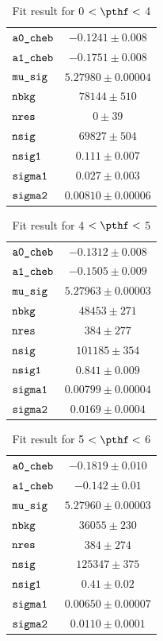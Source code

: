 \begin{table}[H]
    \centering
    \caption{Fit result for 0 $ < \pthf < $ 4}
    \label{tab:fit_results_pthf1}
\begin{tabular}{lc}
$\verb+a0_cheb+ $ & $ -0.1241\pm 0.008$\\
$\verb+a1_cheb+ $ & $ -0.1751\pm 0.008$\\
$\verb+mu_sig+ $ & $  5.27980\pm 0.00004$\\
$\verb+nbkg+ $ & $  78144\pm 510$\\
$\verb+nres+ $ & $  0\pm 39$\\
$\verb+nsig+ $ & $  69827\pm 504$\\
$\verb+nsig1+ $ & $  0.111\pm 0.007$\\
$\verb+sigma1+ $ & $  0.027\pm 0.003$\\
$\verb+sigma2+ $ & $  0.00810\pm 0.00006$\\
\end{tabular}
\end{table}
\begin{table}[H]
    \centering
    \caption{Fit result for 4 $ < \pthf < $ 5}
    \label{tab:fit_results_pthf2}
\begin{tabular}{lc}
$\verb+a0_cheb+ $ & $ -0.1312\pm 0.008$\\
$\verb+a1_cheb+ $ & $ -0.1505\pm 0.009$\\
$\verb+mu_sig+ $ & $  5.27963\pm 0.00003$\\
$\verb+nbkg+ $ & $  48453\pm 271$\\
$\verb+nres+ $ & $  384\pm 277$\\
$\verb+nsig+ $ & $  101185\pm 354$\\
$\verb+nsig1+ $ & $  0.841\pm 0.009$\\
$\verb+sigma1+ $ & $  0.00799\pm 0.00004$\\
$\verb+sigma2+ $ & $  0.0169\pm 0.0004$\\
\end{tabular}
\end{table}
\begin{table}[H]
    \centering
    \caption{Fit result for 5 $ < \pthf < $ 6}
    \label{tab:fit_results_pthf3}
\begin{tabular}{lc}
$\verb+a0_cheb+ $ & $ -0.1819\pm 0.010$\\
$\verb+a1_cheb+ $ & $ -0.142\pm 0.01$\\
$\verb+mu_sig+ $ & $  5.27960\pm 0.00003$\\
$\verb+nbkg+ $ & $  36055\pm 230$\\
$\verb+nres+ $ & $  384\pm 274$\\
$\verb+nsig+ $ & $  125347\pm 375$\\
$\verb+nsig1+ $ & $  0.41\pm 0.02$\\
$\verb+sigma1+ $ & $  0.00650\pm 0.00007$\\
$\verb+sigma2+ $ & $  0.0110\pm 0.0001$\\
\end{tabular}
\end{table}
